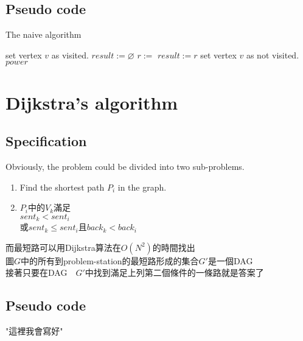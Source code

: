 \subsection{Pseudo code}

\begin{algorithm}[H]
	\label{algo-naive}
	\caption{The naive algorithm}
	\begin{algorithmic}[1]
			\State set vertex $v$ as visited.
			\State $result := \varnothing$
					\State $r := $
				\EndIf 
				    \State $result := r$
				\EndIf
			\EndFor
			\State set vertex $v$ as not visited.
			\State \Return $power$
		\EndFunction
	\end{algorithmic}
\end{algorithm}

\section{Dijkstra's algorithm}

\subsection{Specification}

Obviously, the problem could be divided into two sub-problems.
\begin{enumerate}
  \item Find the shortest path $P_i$ in the graph.
  \item $P_i$中的$V_k$滿足\\
		$sent_k < sent_i$\\
		或$sent_k \leq sent_i$且$back_k < back_i$\\
\end{enumerate}

而最短路可以用Dijkstra算法在$O(N^2)$的時間找出\\
圖$G$中的所有到problem-station的最短路形成的集合$G'$是一個DAG\\
接著只要在DAG~~$G'$中找到滿足上列第二個條件的一條路就是答案了\\


\subsection{Pseudo code}

"這裡我會寫好"\\
